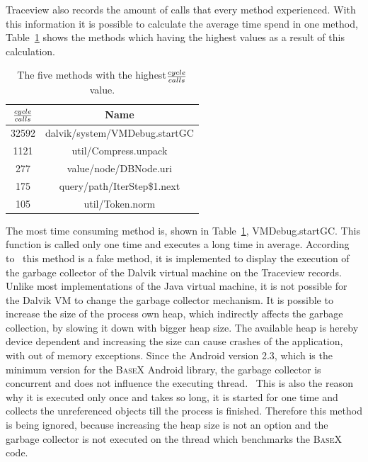Traceview also records the amount of calls that every method experienced.
With this information it is possible to calculate the average time spend in one method, Table~\ref{tab:tob-five-cycle-call} shows the methods which having the highest values as a result of this calculation.
\begin{table}[htpb]
	\centering
	\begin{tabular}{|c|c|}
		\hline
		${cycle \over calls}$&Name\\
		\hline
		32592&dalvik/system/VMDebug.startGC\\
		\hline
		1121&util/Compress.unpack\\
		\hline
		277&value/node/DBNode.uri\\
		\hline
		175&query/path/IterStep\$1.next\\
		\hline
		105&util/Token.norm\\
		\hline
	\end{tabular}
	\caption{The five methods with the highest${cycle \over calls}$ value.}
	\label{tab:tob-five-cycle-call}
\end{table}

The most time consuming method is, shown in Table~\ref{tab:tob-five-cycle-call}, \textsf{VMDebug.startGC}.
This function is called only one time and executes a long time in average.
According to~\cite{vmdebug-startgc} this method is a fake method, it is implemented to display the execution of the garbage collector of the Dalvik virtual machine on the Traceview records.
Unlike most implementations of the Java virtual machine, it is not possible for the Dalvik VM to change the garbage collector mechanism.
It is possible to increase the size of the process own heap, which indirectly affects the garbage collection, by slowing it down with bigger heap size.
The available heap is hereby device dependent and increasing the size can cause crashes of the application, with out of memory exceptions.
Since the Android version 2.3, which is the minimum version for the \textsc{BaseX} Android library, the garbage collector is concurrent and does not influence the executing thread.~\cite{dubroy2011memory}
This is also the reason why it is executed only once and takes so long, it is started for one time and collects the unreferenced objects till the process is finished.
Therefore this method is being ignored, because increasing the heap size is not an option and the garbage collector is not executed on the thread which benchmarks the \textsc{BaseX} code.

